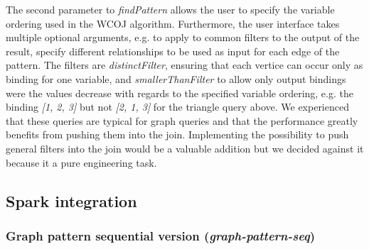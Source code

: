 The second parameter to \textit{findPattern} allows the user to specify the variable ordering used in the WCOJ algorithm.
Furthermore, the user interface takes multiple optional arguments, e.g. to apply to common filters to the output of the result,
specify different relationships to be used as input for each edge of the pattern.
The filters are \textit{distinctFilter}, ensuring that each vertice can occur only as binding for one variable, and
\textit{smallerThanFilter} to allow only output bindings were the values decrease with regards to the specified variable ordering,
e.g. the binding \textit{[1, 2, 3]} but not \textit{[2, 1, 3]} for the triangle query above.
We experienced that these queries are typical for graph queries and that the performance greatly benefits from pushing
them into the join.
Implementing the possibility to push general filters into the join would be a valuable addition but we decided against it because
it a pure engineering task.


\subsection{Spark integration}\label{subsec:spark-integration}




\subsubsection{Graph pattern sequential version (\textit{graph-pattern-seq})}
